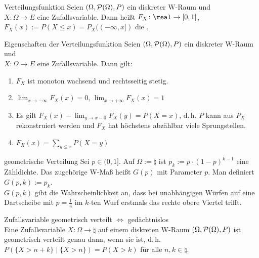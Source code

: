 \linie

\begin{Def}{Verteilungsfunktion}
    Seien $(\Omega, \P(\Omega), P)$ ein diskreter W-Raum und\\
    $X\colon \Omega \rightarrow E$ eine Zufallsvariable.
    Dann heißt $F_X\colon \real \rightarrow [0, 1]$,\\
    $F_X(x) := P(X \le x) = P_X((-\infty, x])$ die
    .
\end{Def}

\begin{Satz}{Eigenschaften der Verteilungsfunktion}
    Seien $(\Omega, \P(\Omega), P)$ ein diskreter W-Raum und\\
    $X\colon \Omega \rightarrow E$ eine Zufallsvariable.
    Dann gilt:
    \begin{enumerate}
        \item
        $F_X$ ist monoton wachsend und rechtsseitig stetig.

        \item
        $\lim_{x \to -\infty} F_X(x) = 0$,
        $\lim_{x \to +\infty} F_X(x) = 1$

        \item
        Es gilt $F_X(x) - \lim_{y \to x - 0} F_X(y) = P(X = x)$,
        d.\,h. $P$ kann aus $P_X$ rekonstruiert werden und
        $F_X$ hat höchstens abzählbar viele Sprungstellen.

        \item
        $F_X(x) = \sum_{y \le x} P(X = y)$
    \end{enumerate}
\end{Satz}

\linie

\begin{Def}{geometrische Verteilung}
    Sei $p \in (0, 1]$. Auf $\Omega := \natural$ ist
    $p_k := p \cdot (1 - p)^{k-1}$ eine Zähldichte.
    Das zugehörige W-Maß heißt  $G(p)$ mit Parameter $p$.
    Man definiert $G(p, k) := p_k$.\\
    $G(p, k)$ gibt die Wahrscheinlichkeit an, dass bei unabhängigen Würfen auf eine Dartscheibe
    mit $p = \frac{1}{4}$ im $k$-ten Wurf erstmals das rechte obere Viertel trifft.
\end{Def}

\begin{Satz}{Zufallsvariable geometrisch verteilt $\iff$ gedächtnislos}\\
    Eine Zufallsvariable $X\colon \Omega \rightarrow \natural$ auf einem diskreten W-Raum
    $(\Omega, \P(\Omega), P)$ ist geometrisch verteilt genau dann, wenn sie 
    ist, d.\,h. $P(\{X > n + k\} \;|\; \{X > n\}) = P(X > k)$ für alle $n, k \in \natural$.
\end{Satz}

